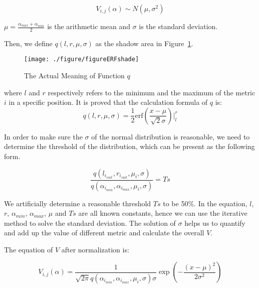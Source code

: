\documentclass[./main.tex]{subfiles}
\begin{document}
    \begin{equation}
        \label{eq:vcd}
        V_{i,j}\left( \alpha \right) \sim N\left( \mu, \sigma^2 \right)
    \end{equation}

    $\mu = \frac{\alpha_{max} + \alpha_{min}}{2}$ is the arithmetic mean and $\sigma$ is the standard deviation.

    Then, we define $q\left( l, r, \mu, \sigma \right)$ as the shadow area in Figure~\ref{fig:figureArea}.

    \begin{figure}[H]
        \centering
        \texttt{[image: ./figure/figureERFshade]}
        \caption{The Actual Meaning of Function $q$}
        \label{fig:figureArea}
    \end{figure}

    where $l$ and $r$ respectively refers to the minimum and the maximum of the metric $i$ in a specific position.
    It is proved that the calculation formula of $q$ is:
    \begin{equation}
        \label{eq:erf}
        q\left( l, r, \mu, \sigma \right) = \frac{1}{2} \text{erf} \left( \frac{x-\mu}{\sqrt{2}\sigma } \right)\bigg|_{l}^{r}
    \end{equation}

    In order to make sure the $\sigma$ of the normal distribution is reasonable, we need to determine the threshold
of the distribution, which can be present as the following form.

    \begin{equation}
        \label{eq:ts}
        \frac{q\left( l_{{i}_{suit}}, r_{{i}_{suit}}, \mu_i, \sigma \right)}{q\left( \alpha_{{i}_{min}}, \alpha_{{i}_{max}}, \mu_i, \sigma \right)}
        = Ts
    \end{equation}

    We artificially determine a reasonable threshold $Ts$ to be 50\%.
    In the equation, $l$, $r$, $\alpha_{min}$, $\alpha_{max}$, $\mu$ and $Ts$ are all known constants, hence we can
use the iterative method to solve the standard deviation.
    The solution of $\sigma$ helps us to quantify and add up the value of different metric and calculate the overall $V$.

    The equation of $V$ after normalization is:

    \begin{equation}
        \label{eq:nv}
        V_{i, j}\left( \alpha \right) = \frac{1}{\sqrt{2\pi}q\left( \alpha_{{i}_{min}}, \alpha_{{i}_{max}}, \mu_i, \sigma \right)\sigma}\exp \left( -\frac{\left( x-\mu \right)^2}{2\sigma^2} \right)
    \end{equation}
\end{document}
